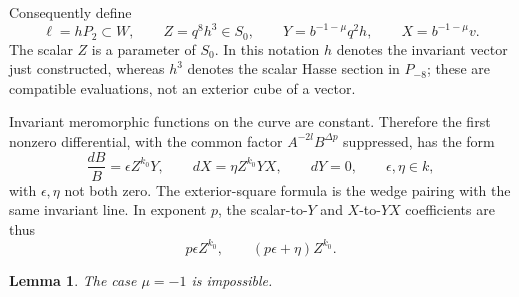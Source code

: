 \documentclass[11pt]{article}
\newtheorem{lemma}[theorem]{Lemma}
\theoremstyle{definition}
\theoremstyle{remark}
\numberwithin{equation}{section}
\begin{document}
Consequently define
\begin{equation}
 \label{h:xyz}
 \ell=hP_2\subset W,\qquad Z=q^8h^3\in S_0,
 \qquad Y=b^{-1-\mu}q^2h,\qquad X=b^{-1-\mu}v.
\end{equation}
The scalar $Z$ is a parameter of $S_0$. In this notation $h$ denotes
the invariant vector just constructed, whereas $h^3$ denotes the
scalar Hasse section in $P_{-8}$; these are compatible evaluations,
not an exterior cube of a vector.

Invariant meromorphic functions on the curve are constant. Therefore
the first nonzero differential, with the common factor
$A^{-2l}B^{\Delta p}$ suppressed, has the form
\begin{equation}
 \label{h:first-plane-differential}
 \frac{dB}{B}=\epsilon Z^{k_0}Y,
 \qquad dX=\eta Z^{k_0}YX,
 \qquad dY=0,
 \qquad \epsilon,\eta\in k,
\end{equation}
with $\epsilon,\eta$ not both zero. The exterior-square formula is
the wedge pairing with the same invariant line. In exponent $p$, the
scalar-to-$Y$ and $X$-to-$YX$ coefficients are thus
\begin{equation}
 \label{h:first-plane-coefficients}
 p\epsilon Z^{k_0},\qquad(p\epsilon+\eta)Z^{k_0}.
\end{equation}

\begin{lemma}
 \label{h:exclude-minus}
 The case $\mu=-1$ is impossible.
\end{lemma}
\end{document}
